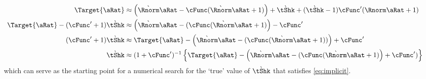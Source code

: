 \documentclass[../BufferStockTheory.tex]{subfiles}\usepackage{ApndxSteadyState}
\begin{document}
  \begin{align}
    \Target{\point} & \approx \left(
                      \Nxt{\Rnorm} \point  - \cFunc(\Nxt{\Rnorm}\point+1)
                      \right)
                      +\Nxt{\tShk}+(\Nxt{\tShk}-1)\cFunc^{\prime}(\Rnorm \point + 1)
    \\ \Target{\point} -(\cFunc^{\prime}+1)\Nxt{\tShk} & \approx  \left(\Nxt{\Rnorm} \point  - (\cFunc(\Nxt{\Rnorm}\point+1)\right)-\cFunc^{\prime}
    \\  (\cFunc^{\prime}+1)\Nxt{\tShk} & \approx \Target{\point}- \left(\Nxt{\Rnorm} \point  - (\cFunc(\Nxt{\Rnorm}\point+1))\right)+\cFunc^{\prime}                                             \\  \Nxt{\tShk} & \approx  (1+\cFunc^{\prime})^{-1}\left\{\Target{\point}- \left(\Nxt{\Rnorm} \point  - (\cFunc(\Nxt{\Rnorm}\point+1)\right)+\cFunc^{\prime})\right\}
  \end{align}
  which can serve as the starting point for a numerical search for the `true' value of $\Nxt{\tShk}$ that satisfies \eqref{eq:implicit}.
\end{document}
